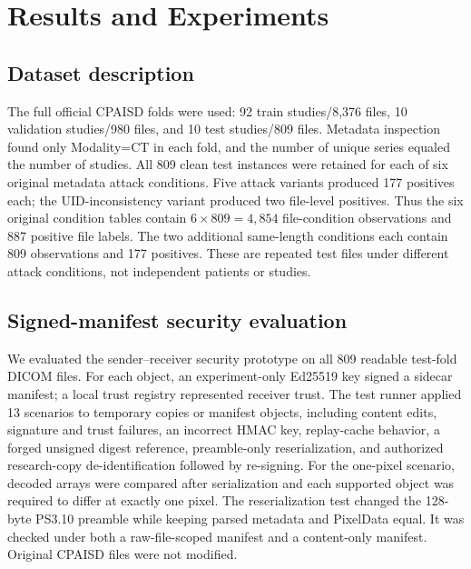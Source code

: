 \documentclass[journal]{IEEEtran}
\begin{document}
  \section{Results and Experiments}
  \subsection{Dataset description}
  The full official CPAISD folds were used: 92 train studies/8,376 files, 10 validation studies/980 files, and 10 test studies/809 files. Metadata inspection found only Modality=CT in each fold, and the number of unique series equaled the number of studies. All 809 clean test instances were retained for each of six original metadata attack conditions. Five attack variants produced 177 positives each; the UID-inconsistency variant produced two file-level positives. Thus the six original condition tables contain $6\times809=4,854$ file-condition observations and 887 positive file labels. The two additional same-length conditions each contain 809 observations and 177 positives. These are repeated test files under different attack conditions, not independent patients or studies.

  \subsection{Signed-manifest security evaluation}
  We evaluated the sender--receiver security prototype on all 809 readable test-fold DICOM files. For each object, an experiment-only Ed25519 key signed a sidecar manifest; a local trust registry represented receiver trust. The test runner applied 13 scenarios to temporary copies or manifest objects, including content edits, signature and trust failures, an incorrect HMAC key, replay-cache behavior, a forged unsigned digest reference, preamble-only reserialization, and authorized research-copy de-identification followed by re-signing. For the one-pixel scenario, decoded arrays were compared after serialization and each supported object was required to differ at exactly one pixel. The reserialization test changed the 128-byte PS3.10 preamble while keeping parsed metadata and PixelData equal. It was checked under both a raw-file-scoped manifest and a content-only manifest. Original CPAISD files were not modified.
\end{document}
